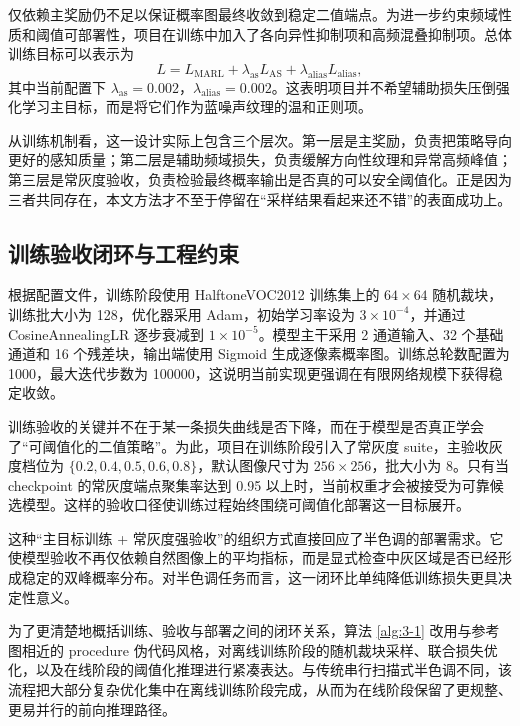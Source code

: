 \documentclass[thesis]{../zstucs-graduation-project}
\begin{document}
仅依赖主奖励仍不足以保证概率图最终收敛到稳定二值端点。为进一步约束频域性质和阈值可部署性，项目在训练中加入了各向异性抑制项和高频混叠抑制项。总体训练目标可以表示为
\begin{equation}
L=L_{\mathrm{MARL}}+\lambda_{\mathrm{as}}L_{\mathrm{AS}}+\lambda_{\mathrm{alias}}L_{\mathrm{alias}},
\label{eq:3-4}
\end{equation}
其中当前配置下 $\lambda_{\mathrm{as}}=0.002$，$\lambda_{\mathrm{alias}}=0.002$。这表明项目并不希望辅助损失压倒强化学习主目标，而是将它们作为蓝噪声纹理的温和正则项。

从训练机制看，这一设计实际上包含三个层次。第一层是主奖励，负责把策略导向更好的感知质量；第二层是辅助频域损失，负责缓解方向性纹理和异常高频峰值；第三层是常灰度验收，负责检验最终概率输出是否真的可以安全阈值化。正是因为三者共同存在，本文方法才不至于停留在“采样结果看起来还不错”的表面成功上。

\subsection{训练验收闭环与工程约束}
根据配置文件，训练阶段使用 HalftoneVOC2012 训练集上的 $64\times64$ 随机裁块，训练批大小为 128，优化器采用 Adam，初始学习率设为 $3\times10^{-4}$，并通过 CosineAnnealingLR 逐步衰减到 $1\times10^{-5}$。模型主干采用 2 通道输入、32 个基础通道和 16 个残差块，输出端使用 Sigmoid 生成逐像素概率图。训练总轮数配置为 1000，最大迭代步数为 100000，这说明当前实现更强调在有限网络规模下获得稳定收敛。

训练验收的关键并不在于某一条损失曲线是否下降，而在于模型是否真正学会了“可阈值化的二值策略”。为此，项目在训练阶段引入了常灰度 suite，主验收灰度档位为 $\{0.2,0.4,0.5,0.6,0.8\}$，默认图像尺寸为 $256\times256$，批大小为 8。只有当 checkpoint 的常灰度端点聚集率达到 0.95 以上时，当前权重才会被接受为可靠候选模型。这样的验收口径使训练过程始终围绕可阈值化部署这一目标展开。

这种“主目标训练 + 常灰度强验收”的组织方式直接回应了半色调的部署需求。它使模型验收不再仅依赖自然图像上的平均指标，而是显式检查中灰区域是否已经形成稳定的双峰概率分布。对半色调任务而言，这一闭环比单纯降低训练损失更具决定性意义。

为了更清楚地概括训练、验收与部署之间的闭环关系，算法 \ref{alg:3-1} 改用与参考图相近的 procedure 伪代码风格，对离线训练阶段的随机裁块采样、联合损失优化，以及在线阶段的阈值化推理进行紧凑表达。与传统串行扫描式半色调不同，该流程把大部分复杂优化集中在离线训练阶段完成，从而为在线阶段保留了更规整、更易并行的前向推理路径。
\end{document}
